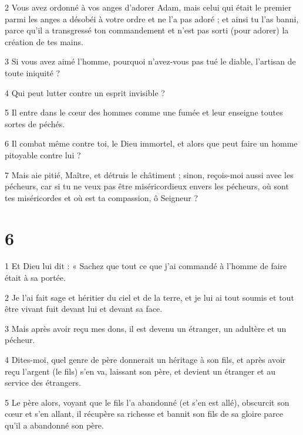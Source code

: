 \par 2 Vous avez ordonné à vos anges d'adorer Adam, mais celui qui était le premier parmi les anges a désobéi à votre ordre et ne l'a pas adoré ; et ainsi tu l'as banni, parce qu'il a transgressé ton commandement et n'est pas sorti (pour adorer) la création de tes mains.

\par 3 Si vous avez aimé l'homme, pourquoi n'avez-vous pas tué le diable, l'artisan de toute iniquité ?

\par 4 Qui peut lutter contre un esprit invisible ?

\par 5 Il entre dans le cœur des hommes comme une fumée et leur enseigne toutes sortes de péchés.

\par 6 Il combat même contre toi, le Dieu immortel, et alors que peut faire un homme pitoyable contre lui ?

\par 7 Mais aie pitié, Maître, et détruis le châtiment ; sinon, reçois-moi aussi avec les pécheurs, car si tu ne veux pas être miséricordieux envers les pécheurs, où sont tes miséricordes et où est ta compassion, ô Seigneur ?


\chapter{6}

\par 1 Et Dieu lui dit : « Sachez que tout ce que j'ai commandé à l'homme de faire était à sa portée.

\par 2 Je l'ai fait sage et héritier du ciel et de la terre, et je lui ai tout soumis et tout être vivant fuit devant lui et devant sa face.

\par 3 Mais après avoir reçu mes dons, il est devenu un étranger, un adultère et un pécheur.

\par 4 Dites-moi, quel genre de père donnerait un héritage à son fils, et après avoir reçu l'argent (le fils) s'en va, laissant son père, et devient un étranger et au service des étrangers.

\par 5 Le père alors, voyant que le fils l'a abandonné (et s'en est allé), obscurcit son cœur et s'en allant, il récupère sa richesse et bannit son fils de sa gloire parce qu'il a abandonné son père.

